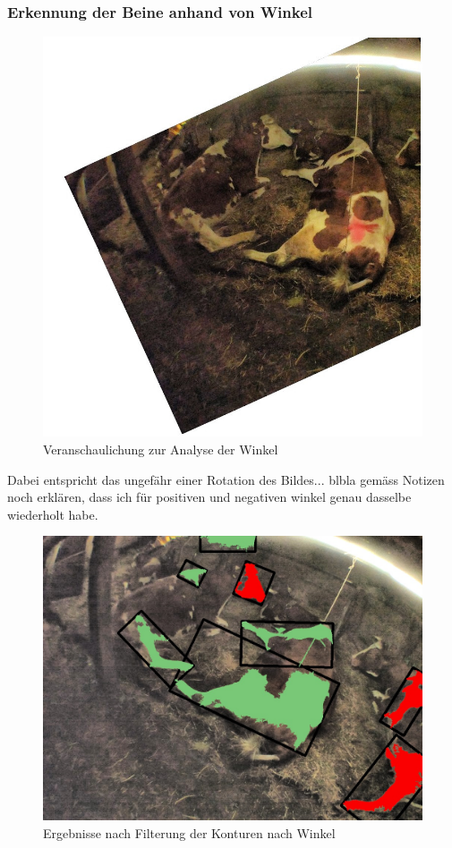 \subsubsection{Erkennung der Beine anhand von Winkel}
\begin{figure}[H]
	\center
	\includegraphics[scale=1.3]{Grafiken/entwicklung/21AngleCorrecturDemonstration.jpg}
	\caption{Veranschaulichung zur Analyse der Winkel} 
	\label{fig: Veranschaulichung zur Analyse der Winkel} 
\end{figure}


Dabei entspricht das ungefähr einer Rotation des Bildes... blbla gemäss Notizen
noch erklären, dass ich für positiven und negativen winkel genau dasselbe wiederholt habe.

\begin{figure}[H]
	\center
	\includegraphics[scale=0.43]{Grafiken/entwicklung/22AngleCorrectur.jpg}
	\caption{Ergebnisse nach Filterung der Konturen nach Winkel} 
	\label{fig: Ergebnisse nach Filterung der Konturen nach Winkel} 
\end{figure}
